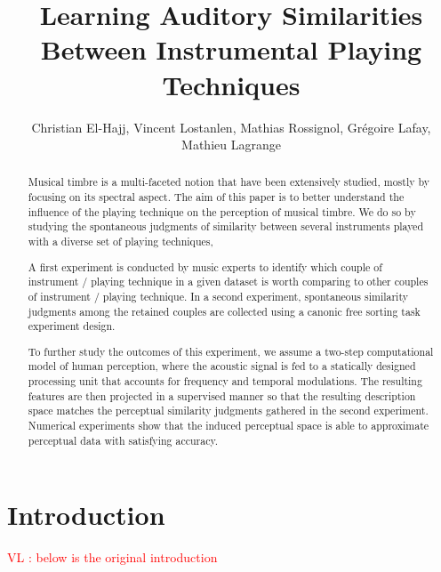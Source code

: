 \documentclass{article}
\title{Learning Auditory Similarities Between Instrumental Playing Techniques}
\author{
Christian El-Hajj,
Vincent Lostanlen,
Mathias Rossignol,
Gr\'egoire Lafay,
Mathieu Lagrange}
\newcommand{\vl}[1]{\textcolor{red}{VL : #1}}
\begin{document}
\maketitle




\begin{abstract}

Musical timbre is a multi-faceted notion that have been extensively studied, mostly by focusing on its spectral aspect.
The aim of this paper is to better understand the influence of the playing technique on the perception of musical timbre.
We do so by studying the spontaneous judgments of similarity between several instruments played with a diverse set of playing techniques,

A first experiment is conducted by music experts to identify which couple of instrument / playing technique in a given dataset is worth comparing to other couples of instrument / playing technique.
In a second experiment, spontaneous similarity judgments among the retained couples are collected using a canonic free sorting task experiment design.

To further study the outcomes of this experiment, we assume a two-step computational model of human perception, where the acoustic signal is fed to a statically designed processing unit that accounts for frequency and temporal modulations.
The resulting features are then projected in a supervised manner so that the resulting description space matches the perceptual similarity judgments gathered in the second experiment.
Numerical experiments show that the induced perceptual space is able to approximate perceptual data with satisfying accuracy.

\end{abstract}


\section{Introduction}\label{sec:introduction}


\vl{below is the original introduction}
\end{document}
